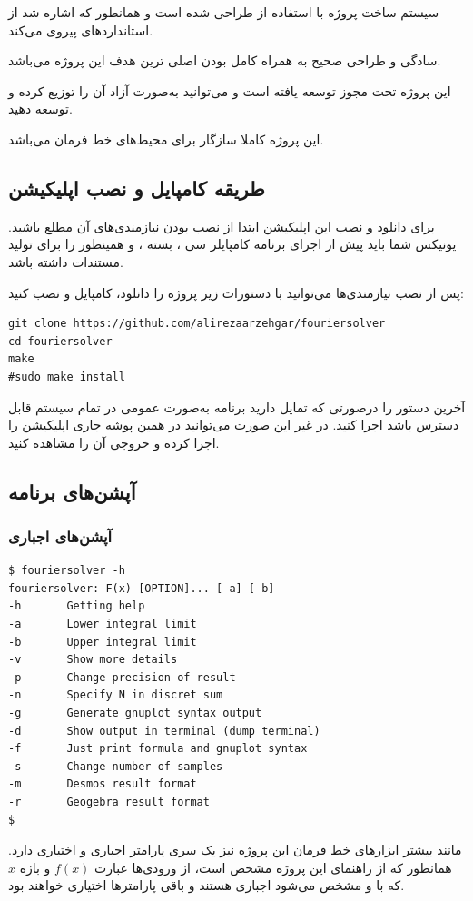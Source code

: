 \documentclass[a4paper]{report}
\begin{document}
سیستم ساخت
پروژه با استفاده از  طراحی شده است و همانطور که اشاره شد از استانداردهای  پیروی می‌کند.

سادگی و طراحی صحیح به همراه کامل بودن اصلی ترین هدف این پروژه می‌باشد.

این پروژه تحت مجوز 
توسعه یافته است و می‌توانید به‌صورت آزاد آن را توزیع کرده و توسعه دهید.

این پروژه کاملا سازگار برای محیط‌های خط فرمان می‌باشد.

\subsection{طریقه کامپایل و نصب اپلیکیشن}
برای دانلود و نصب این اپلیکیشن ابتدا از نصب بودن نیازمندی‌های آن مطلع باشید. یونیکس شما باید پیش از اجرای برنامه
کامپایلر سی
، 
بسته ، و همینطور  را برای تولید مستندات داشته باشد.

پس از نصب نیازمندی‌ها می‌توانید با دستورات زیر پروژه‌ را دانلود، کامپایل و نصب کنید:

\begin{latin}
\begin{verbatim}
git clone https://github.com/alirezaarzehgar/fouriersolver
cd fouriersolver
make
#sudo make install
\end{verbatim}
\end{latin}
آخرین دستور را درصورتی که تمایل دارید برنامه به‌صورت عمومی در تمام سیستم قابل دسترس باشد اجرا کنید. در غیر این صورت
می‌توانید در همین پوشه جاری اپلیکیشن را اجرا کرده و خروجی آن را مشاهده کنید.

\subsection{آپشن‌های برنامه}
\subsubsection{آپشن‌های اجباری}

\begin{latin}
\begin{verbatim}
$ fouriersolver -h
fouriersolver: F(x) [OPTION]... [-a] [-b]
-h       Getting help
-a       Lower integral limit
-b       Upper integral limit
-v       Show more details
-p       Change precision of result
-n       Specify N in discret sum
-g       Generate gnuplot syntax output
-d       Show output in terminal (dump terminal)
-f       Just print formula and gnuplot syntax
-s       Change number of samples
-m       Desmos result format
-r       Geogebra result format
$
\end{verbatim}
\end{latin}
مانند بیشتر ابزارهای خط فرمان این پروژه نیز یک سری پارامتر اجباری و اختیاری دارد. همانطور که از راهنمای این پروژه مشخص است،
از ورودی‌ها عبارت $f(x)$ و بازه $x$ که با  و  مشخص می‌شود اجباری هستند و باقی پارامترها اختیاری خواهند بود.
\end{document}
